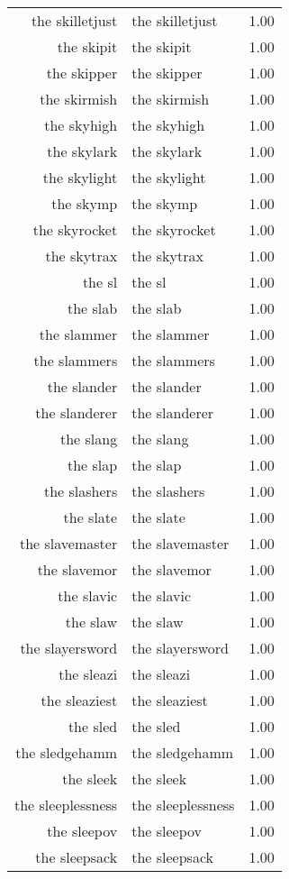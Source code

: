 \begin{table}[ht]
\begin{tabular}{rlr}
  the skilletjust & the skilletjust & 1.00 \\ 
  the skipit & the skipit & 1.00 \\ 
  the skipper & the skipper & 1.00 \\ 
  the skirmish & the skirmish & 1.00 \\ 
  the skyhigh & the skyhigh & 1.00 \\ 
  the skylark & the skylark & 1.00 \\ 
  the skylight & the skylight & 1.00 \\ 
  the skymp & the skymp & 1.00 \\ 
  the skyrocket & the skyrocket & 1.00 \\ 
  the skytrax & the skytrax & 1.00 \\ 
  the sl & the sl & 1.00 \\ 
  the slab & the slab & 1.00 \\ 
  the slammer & the slammer & 1.00 \\ 
  the slammers & the slammers & 1.00 \\ 
  the slander & the slander & 1.00 \\ 
  the slanderer & the slanderer & 1.00 \\ 
  the slang & the slang & 1.00 \\ 
  the slap & the slap & 1.00 \\ 
  the slashers & the slashers & 1.00 \\ 
  the slate & the slate & 1.00 \\ 
  the slavemaster & the slavemaster & 1.00 \\ 
  the slavemor & the slavemor & 1.00 \\ 
  the slavic & the slavic & 1.00 \\ 
  the slaw & the slaw & 1.00 \\ 
  the slayersword & the slayersword & 1.00 \\ 
  the sleazi & the sleazi & 1.00 \\ 
  the sleaziest & the sleaziest & 1.00 \\ 
  the sled & the sled & 1.00 \\ 
  the sledgehamm & the sledgehamm & 1.00 \\ 
  the sleek & the sleek & 1.00 \\ 
  the sleeplessness & the sleeplessness & 1.00 \\ 
  the sleepov & the sleepov & 1.00 \\ 
  the sleepsack & the sleepsack & 1.00 \\ 

\end{tabular}
\end{table}
